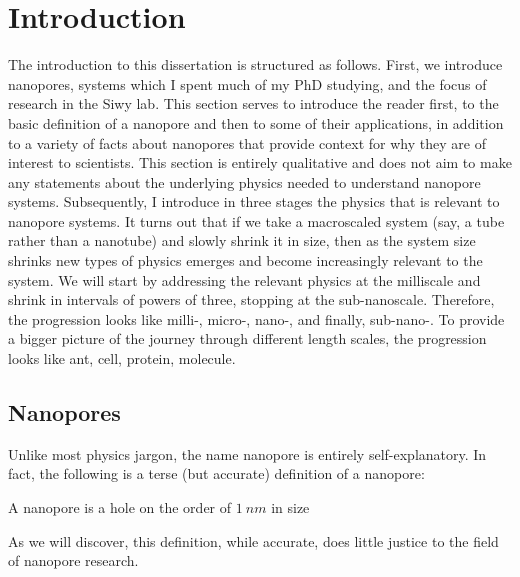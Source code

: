 \graphicspath{{../images/ch1/}}	%


\chapter{Introduction}
\label{chap:intro}


	The introduction to this dissertation is structured as follows. First, we introduce nanopores, systems which I spent much of my PhD studying, and the focus of research in the Siwy lab. This section serves to introduce the reader first, to the basic definition of a nanopore and then to some of their applications, in addition to a variety of facts about nanopores that provide context for why they are of interest to scientists. This section is entirely qualitative and does not aim to make any statements about the underlying physics needed to understand nanopore systems. Subsequently, I introduce in three stages the physics that is relevant to nanopore systems. It turns out that if we take a macroscaled system (say, a tube rather than a nanotube) and slowly shrink it in size, then as the system size shrinks new types of physics emerges and become increasingly relevant to the system. We will start by addressing the relevant physics at the milliscale and shrink in intervals of powers of three, stopping at the sub-nanoscale. Therefore, the progression looks like milli-, micro-, nano-, and finally, sub-nano-. To provide a bigger picture of the journey through different length scales, the progression looks like ant, cell, protein, molecule.

	\section{Nanopores}

		Unlike most physics jargon, the name nanopore is entirely self-explanatory. In fact, the following is a terse (but accurate) definition of a nanopore:


		\begin{definition} \label{def:nanopore}
			A nanopore is a hole on the order of $\SI{1}{nm}$ in size
		\end{definition}


		As we will discover, this definition, while accurate, does little justice to the field of nanopore research. 

